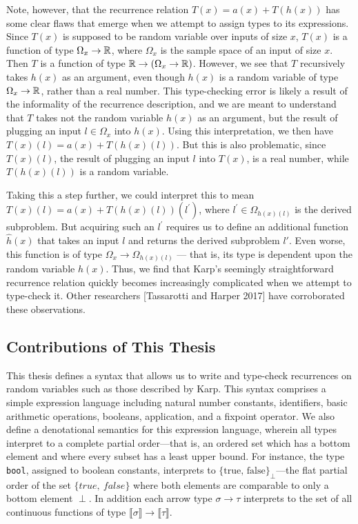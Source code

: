 Note, however, that the recurrence relation $T(x) = a(x) + T(h(x))$ has some clear flaws that 
emerge when we attempt to assign types to its expressions. Since $T(x)$ is supposed to be random
variable over inputs of size $x$, $T(x)$ is a function of type 
$\Omega_x \rightarrow \mathbb{R}$, where $\Omega_x$ is the sample space of an input of size $x$. Then $T$ is a 
function of type $\mathbb{R} \rightarrow (\Omega_x \rightarrow \mathbb{R})$. However, we see that $T$ recursively takes 
$h(x)$ as an argument, even though $h(x)$ is a random variable of type $\Omega_x \rightarrow \mathbb{R}$, 
rather than a real number. This type-checking error is likely a result of the informality of the recurrence description, 
and we are meant to understand that $T$ takes not the 
random variable $h(x)$ as an argument, but the result of plugging an input $l \in \Omega_x$ into $h(x)$. Using this 
interpretation, we then have $T(x)(l) = a(x) + T(h(x)(l))$. But this is also problematic, since $T(x)(l)$, the result 
of plugging an input $l$ into $T(x)$, is a real number, while $T(h(x)(l))$ is a random variable. 

Taking this a step further, we could interpret this to mean $T(x)(l) = a(x) + T(h(x)(l))(l^\prime)$, where $l^\prime \in 
\Omega_{h(x)(l)}$ is the derived subproblem. But acquiring such an $l^\prime$ requires us to define an 
additional function $\hat{h}(x)$ that takes an input $l$ and returns the derived subproblem $l'$. 
Even worse, this function is of type $\Omega_x \rightarrow \Omega_{h(x)(l)}$ --- that is, its type is dependent 
upon the random variable $h(x)$. Thus, we find that Karp's seemingly straightforward recurrence relation quickly becomes 
increasingly complicated when we attempt to type-check it. Other researchers [Tassarotti and Harper 2017] have corroborated 
these observations. 


\subsection{Contributions of This Thesis}

This thesis defines a syntax that allows us to write and type-check recurrences on
random variables such as those described by Karp. This syntax comprises a simple expression language including natural number constants, identifiers, basic arithmetic operations, booleans, application, and a fixpoint operator. We also define a 
denotational semantics for this expression language, wherein all types interpret to a complete partial order---that is, an ordered
set which has a bottom element and where every subset has a least upper bound. For instance, the type {\tt bool}, assigned
to boolean constants, interprets to $\{\text{true, false}\}_{\perp}$---the flat partial order of the set  $\{true, 
\ false\}$ where
both elements are comparable to only a bottom element $\perp$. In addition each arrow type $\sigma 
\rightarrow \tau$ interprets to the set of all continuous functions of type $\llbracket \sigma \rrbracket \rightarrow 
\llbracket \tau \rrbracket$. 
 
